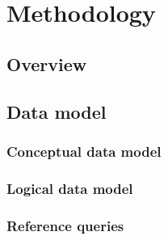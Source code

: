 
\chapter{Methodology}
\label{ch:methodology}


\section{Overview}
\label{sec:overview}



\section{Data model}
\label{sec:data-model}


\subsection{Conceptual data model}
\label{sec:conceptual-data-model}

\subsection{Logical data model}
\label{sec:logical-data-model}

\subsection{Reference queries}
\label{sec:reference-queries}


